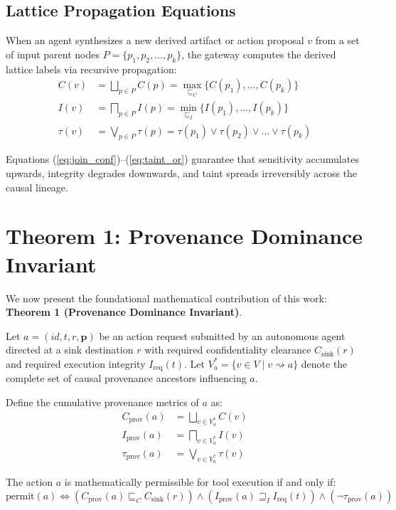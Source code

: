 \subsection{Lattice Propagation Equations}
When an agent synthesizes a new derived artifact or action proposal $v$ from a set of input parent nodes $P = \{p_1, p_2, \dots, p_k\}$, the gateway computes the derived lattice labels via recursive propagation:
\begin{align}
C(v) &= \bigsqcup_{p \in P} C(p) = \max_{\sqsubseteq_C} \{C(p_1), \dots, C(p_k)\} \label{eq:join_conf} \\
I(v) &= \bigsqcap_{p \in P} I(p) = \min_{\sqsubseteq_I} \{I(p_1), \dots, I(p_k)\} \label{eq:meet_integ} \\
\tau(v) &= \bigvee_{p \in P} \tau(p) = \tau(p_1) \lor \tau(p_2) \lor \dots \lor \tau(p_k) \label{eq:taint_or}
\end{align}

Equations (\ref{eq:join_conf})--(\ref{eq:taint_or}) guarantee that sensitivity accumulates upwards, integrity degrades downwards, and taint spreads irreversibly across the causal lineage.

\section{Theorem 1: Provenance Dominance Invariant}
We now present the foundational mathematical contribution of this work: \textbf{Theorem 1 (Provenance Dominance Invariant)}.

\begin{theorem}
\label{thm:dominance}
Let $a = (id, t, r, \mathbf{p})$ be an action request submitted by an autonomous agent directed at a sink destination $r$ with required confidentiality clearance $C_{\text{sink}}(r)$ and required execution integrity $I_{\text{req}}(t)$. Let $V_a^* = \{v \in V \mid v \rightsquigarrow a\}$ denote the complete set of causal provenance ancestors influencing $a$.

Define the cumulative provenance metrics of $a$ as:
\begin{align}
C_{\text{prov}}(a) &= \bigsqcup_{v \in V_a^*} C(v) \\
I_{\text{prov}}(a) &= \bigsqcap_{v \in V_a^*} I(v) \\
\tau_{\text{prov}}(a) &= \bigvee_{v \in V_a^*} \tau(v)
\end{align}

The action $a$ is mathematically permissible for tool execution if and only if:
\begin{equation}
\label{eq:theorem1}
\text{permit}(a) \iff \left( C_{\text{prov}}(a) \sqsubseteq_C C_{\text{sink}}(r) \right) \land \left( I_{\text{prov}}(a) \sqsupseteq_I I_{\text{req}}(t) \right) \land \left( \neg \tau_{\text{prov}}(a) \right)
\end{equation}
\end{theorem}

